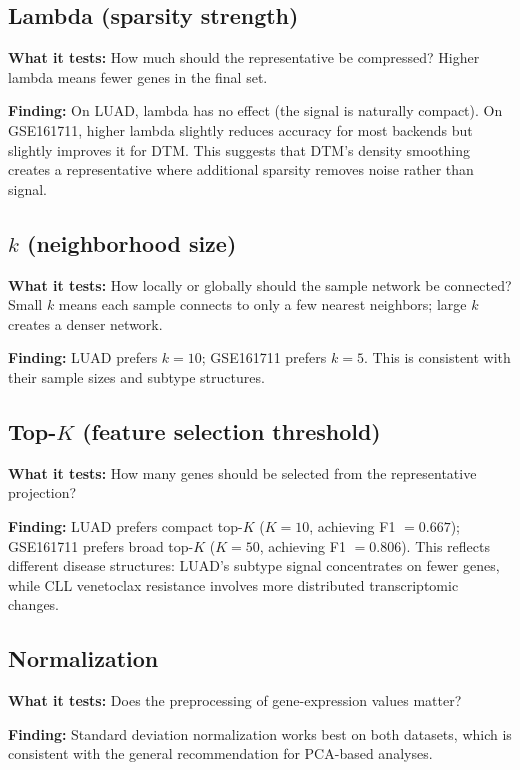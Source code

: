 \documentclass[11pt]{article}
\begin{document}
\subsection{Lambda (sparsity strength)}

\textbf{What it tests:} How much should the representative be compressed?
Higher lambda means fewer genes in the final set.

\textbf{Finding:} On LUAD, lambda has no effect (the signal is naturally compact).
On GSE161711, higher lambda slightly reduces accuracy for most backends but slightly improves it for DTM.
This suggests that DTM's density smoothing creates a representative where additional sparsity removes noise rather than signal.

\subsection{$k$ (neighborhood size)}

\textbf{What it tests:} How locally or globally should the sample network be connected?
Small $k$ means each sample connects to only a few nearest neighbors; large $k$ creates a denser network.

\textbf{Finding:} LUAD prefers $k = 10$; GSE161711 prefers $k = 5$.
This is consistent with their sample sizes and subtype structures.

\subsection{Top-$K$ (feature selection threshold)}

\textbf{What it tests:} How many genes should be selected from the representative projection?

\textbf{Finding:} LUAD prefers compact top-$K$ ($K = 10$, achieving F1 $= 0.667$); GSE161711 prefers broad top-$K$ ($K = 50$, achieving F1 $= 0.806$).
This reflects different disease structures: LUAD's subtype signal concentrates on fewer genes, while CLL venetoclax resistance involves more distributed transcriptomic changes.

\subsection{Normalization}

\textbf{What it tests:} Does the preprocessing of gene-expression values matter?

\textbf{Finding:} Standard deviation normalization works best on both datasets, which is consistent with the general recommendation for PCA-based analyses.
\end{document}
